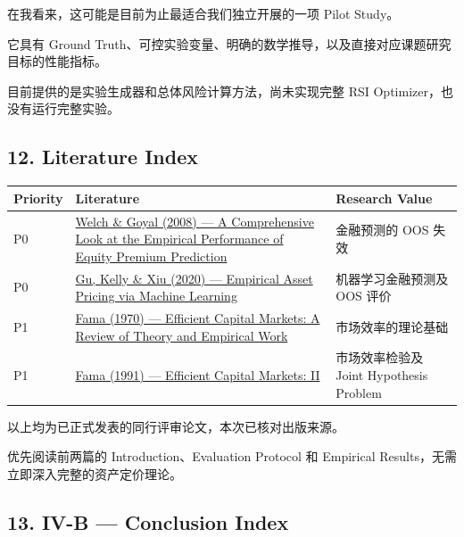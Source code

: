 在我看来，这可能是目前为止最适合我们独立开展的一项 Pilot Study。

它具有 Ground Truth、可控实验变量、明确的数学推导，以及直接对应课题研究目标的性能指标。

目前提供的是实验生成器和总体风险计算方法，尚未实现完整 RSI Optimizer，也没有运行完整实验。

\hypertarget{part-4-60-0001-literature-index}{%
\subsection{12. Literature Index}\label{part-4-60-0001-literature-index}}

\begin{readertable}
\begin{longtable}[]{@{}
  >{\raggedright\arraybackslash}p{}
  >{\raggedright\arraybackslash}p{}
  >{\raggedright\arraybackslash}p{}@{}}
\toprule
Priority & Literature & Research Value \\
\midrule
\endhead
P0 & \href{https://doi.org/10.1093/RFS/HHM014}{Welch \& Goyal (2008) --- A Comprehensive Look at the Empirical Performance of Equity Premium Prediction} & 金融预测的 OOS 失效 \\
P0 & \href{https://doi.org/10.1093/rfs/hhaa009}{Gu, Kelly \& Xiu (2020) --- Empirical Asset Pricing via Machine Learning} & 机器学习金融预测及 OOS 评价 \\
P1 & \href{https://doi.org/10.1111/j.1540-6261.1970.tb00518.x}{Fama (1970) --- Efficient Capital Markets: A Review of Theory and Empirical Work} & 市场效率的理论基础 \\
P1 & \href{https://onlinelibrary.wiley.com/doi/full/10.1111/j.1540-6261.1991.tb04636.x}{Fama (1991) --- Efficient Capital Markets: II} & 市场效率检验及 Joint Hypothesis Problem \\
\bottomrule
\end{longtable}
\end{readertable}

以上均为已正式发表的同行评审论文，本次已核对出版来源。

优先阅读前两篇的 Introduction、Evaluation Protocol 和 Empirical Results，无需立即深入完整的资产定价理论。

\hypertarget{part-4-60-0001-iv-b-conclusion-index}{%
\subsection{13. IV-B --- Conclusion Index}\label{part-4-60-0001-iv-b-conclusion-index}}

